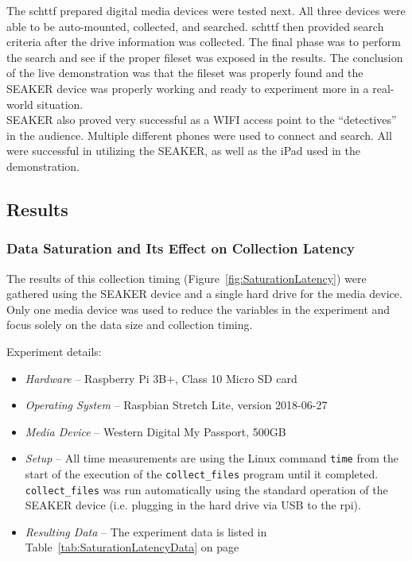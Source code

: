 \documentclass[12pt]{article}
\begin{document}
The \gls{schttf} prepared digital media devices were tested next.  All three devices
were able to be auto-mounted, collected, and searched.  \gls{schttf} then provided
search criteria after the drive information was collected.  The final phase was to perform the
search and see if the proper fileset was exposed in the results.  The conclusion
of the live demonstration was that the fileset was properly found and the SEAKER
device was properly working and ready to experiment more in a real-world situation.\\

SEAKER also proved very successful as a WIFI access point to the ``detectives'' in
the audience.  Multiple different phones were used to connect and search.  All were
successful in utilizing the SEAKER, as well as the iPad used in the demonstration. 

\subsection{Results}

\subsubsection{Data Saturation and Its Effect on Collection Latency}

The results of this collection timing (Figure~\ref{fig:SaturationLatency})
were gathered using the SEAKER device and a single hard drive for the media device.
Only one media device was used to reduce the variables in the experiment and focus
solely on the data size and collection timing.

Experiment details:

\begin{itemize}
  \item {\em Hardware} -- Raspberry Pi 3B+, Class 10 Micro SD card
  \item {\em Operating System} -- Raspbian Stretch Lite, version 2018-06-27
  \item {\em Media Device} -- Western Digital My Passport\texttrademark, 500GB
  \item {\em Setup} -- All time measurements are using the Linux 
  command \verb|time| from the start of the execution of the \verb|collect_files|
  program until it completed.  \verb|collect_files| was run automatically
  using the standard operation of the SEAKER device (i.e. plugging in the hard
  drive via USB to the \gls{rpi}).
  \item {\em Resulting Data} -- The experiment data is listed in
  Table~\ref{tab:SaturationLatencyData} on page~\pageref{tab:SaturationLatencyData}
\end{itemize}
\end{document}
